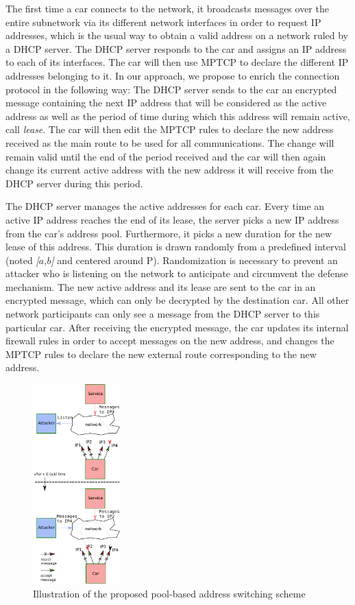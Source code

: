 The first time a car connects to the network, it broadcasts messages
over the entire subnetwork via its different network interfaces in
order to request IP addresses, which is the usual way to obtain a
valid address on a network ruled by a DHCP server. The DHCP server
responds to the car and assigns an IP address to each of its
interfaces. The car will then use MPTCP to declare the different IP
addresses belonging to it. In our approach, we propose to enrich the
connection protocol in the following way: The DHCP server sends to the
car an encrypted message containing the next IP address that will be
considered as the active address as well as the period of time during
which this address will remain active, call \emph{lease}. The car will then
edit the MPTCP rules to declare the new address received as the main
route to be used for all communications. The change will remain valid
until the end of the period received and the car will then again
change its current active address with the new address it will receive
from the DHCP server during this period.


The DHCP server manages the active addresses for each car. Every time
an active IP address reaches the end of its lease, the server picks a
new IP address from the car's address pool. Furthermore, it picks a
new duration for the new lease of this address. This duration
is drawn randomly from a predefined interval (noted \emph{[$a$,$b$]} and
centered around P). Randomization is necessary to prevent an attacker
who is listening on the network to anticipate and circumvent the
defense mechanism. The new active address and its lease
are sent to the car in an encrypted message, which can only be
decrypted by the destination car. All other network participants can
only see a message from the DHCP server to this particular car. After
receiving the encrypted message, the car updates its internal firewall
rules in order to accept messages on the new address, and changes the
MPTCP rules to declare the new external route corresponding to the new
address.

\begin{figure}[t]
    \centering
	\includegraphics[width=0.3\textwidth]{schema/new2.pdf}
    \caption{Illustration of the proposed pool-based address switching scheme}
    \label{second}
\end{figure}

